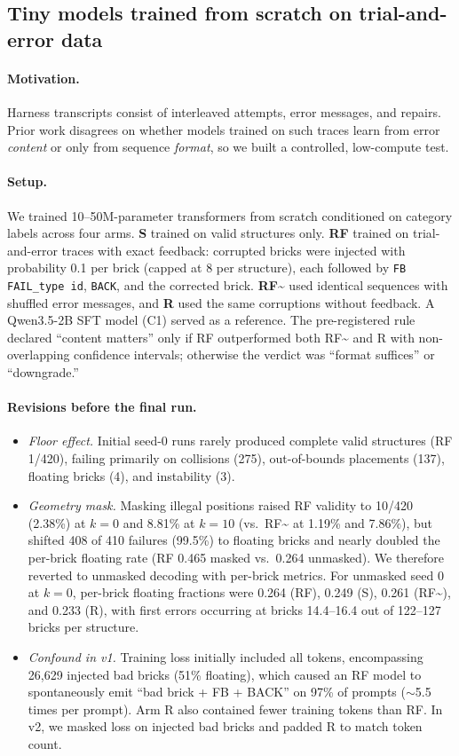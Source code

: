\documentclass{article}
\begin{document}
\subsection{Tiny models trained from scratch on trial-and-error data}
\label{ex:tiny}
\paragraph{Motivation.} Harness transcripts consist of interleaved attempts, error messages, and repairs. Prior work disagrees on whether models trained on such traces learn from error \emph{content} or only from sequence \emph{format}, so we built a controlled, low-compute test.

\paragraph{Setup.} We trained 10--50M-parameter transformers from scratch conditioned on category labels across four arms. \textbf{S} trained on valid structures only. \textbf{RF} trained on trial-and-error traces with exact feedback: corrupted bricks were injected with probability 0.1 per brick (capped at 8 per structure), each followed by \texttt{FB FAIL\_type id}, \texttt{BACK}, and the corrected brick. \textbf{RF\~{}} used identical sequences with shuffled error messages, and \textbf{R} used the same corruptions without feedback. A Qwen3.5-2B SFT model (C1) served as a reference. The pre-registered rule declared ``content matters'' only if RF outperformed both RF\~{} and R with non-overlapping confidence intervals; otherwise the verdict was ``format suffices'' or ``downgrade.''

\paragraph{Revisions before the final run.}
\begin{itemize}\itemsep0pt
\item \emph{Floor effect.} Initial seed-0 runs rarely produced complete valid structures (RF 1/420), failing primarily on collisions (275), out-of-bounds placements (137), floating bricks (4), and instability (3).
\item \emph{Geometry mask.} Masking illegal positions raised RF validity to 10/420 (2.38\%) at $k{=}0$ and 8.81\% at $k{=}10$ (vs.\ RF\~{} at 1.19\% and 7.86\%), but shifted 408 of 410 failures (99.5\%) to floating bricks and nearly doubled the per-brick floating rate (RF 0.465 masked vs.\ 0.264 unmasked). We therefore reverted to unmasked decoding with per-brick metrics. For unmasked seed 0 at $k{=}0$, per-brick floating fractions were 0.264 (RF), 0.249 (S), 0.261 (RF\~{}), and 0.233 (R), with first errors occurring at bricks 14.4--16.4 out of 122--127 bricks per structure.
\item \emph{Confound in v1.} Training loss initially included all tokens, encompassing 26{,}629 injected bad bricks (51\% floating), which caused an RF model to spontaneously emit ``bad brick + FB + BACK'' on 97\% of prompts ($\sim$5.5 times per prompt). Arm R also contained fewer training tokens than RF. In v2, we masked loss on injected bad bricks and padded R to match token count.
\end{itemize}
\end{document}
